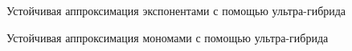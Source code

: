 ﻿\documentclass[a4paper, 12pt]{article}
\begin{document}
\begin{figure}[h!]
    \noindent{}
   \caption{Устойчивая аппроксимация экспонентами с помощью ультра-гибрида}
    \label{figCurves}
\end{figure} 

\begin{figure}[h!]
    \noindent{}
   \caption{Устойчивая аппроксимация мономами с помощью ультра-гибрида}
    \label{figCurves}
\end{figure}
\end{document}
